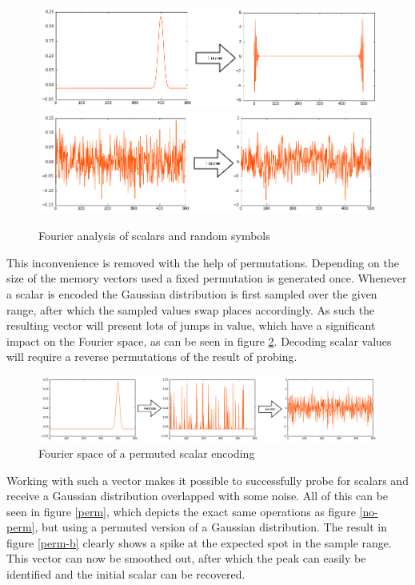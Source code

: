 \documentclass[a4paper,twoside]{article}
\begin{document}
\begin{figure}[th!]
	\includegraphics[width=\columnwidth]{img/scalar-pre-perm-fft.png}
	\includegraphics[width=\columnwidth]{img/scalar-random-fft.png}
	\caption{Fourier analysis of scalars and random symbols}
	\label{fft}
\end{figure}
	
	This inconvenience is removed with the help of permutations.
Depending on the size of the memory vectors used a fixed permutation is generated once.
Whenever a scalar is encoded the Gaussian distribution is first sampled over the given range, after which the sampled values swap places accordingly.
As such the resulting vector will present lots of jumps in value, which have a significant impact on the Fourier space, as can be seen in figure \ref{perm-fft}. Decoding scalar values will require a reverse permutations of the result of probing.
	
	\begin{figure}
		\includegraphics[width=\columnwidth]{img/scalar-perm-step-fft.png}
		\caption{Fourier space of a permuted scalar encoding}
		\label{perm-fft}
	\end{figure}
	
	Working with such a vector makes it possible to successfully probe for scalars and receive a Gaussian distribution overlapped with some noise.
All of this can be seen in figure \ref{perm}, which depicts the exact same operations as figure \ref{no-perm}, but using a permuted version of a Gaussian distribution.
The result in figure \ref{perm-b} clearly shows a spike at the expected spot in the sample range.
This vector can now be smoothed out, after which the peak can easily be identified and the initial scalar can be recovered.
	
\end{document}
